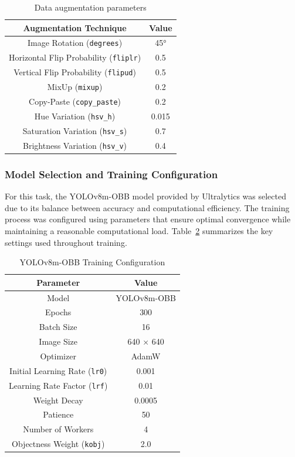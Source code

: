 \begin{table}[H]
\centering
\caption{Data augmentation parameters}
\label{tab:augmentations}
\begin{tabular}{|c|c|}
\hline
\textbf{Augmentation Technique} & \textbf{Value} \\
\hline
Image Rotation (\texttt{degrees}) & 45° \\
Horizontal Flip Probability (\texttt{fliplr}) & 0.5 \\
Vertical Flip Probability (\texttt{flipud}) & 0.5 \\
MixUp (\texttt{mixup}) & 0.2 \\
Copy-Paste (\texttt{copy\_paste}) & 0.2 \\
Hue Variation (\texttt{hsv\_h}) & 0.015 \\
Saturation Variation (\texttt{hsv\_s}) & 0.7 \\
Brightness Variation (\texttt{hsv\_v}) & 0.4 \\
\hline
\end{tabular}
\end{table}

\subsubsection{Model Selection and Training Configuration}

For this task, the YOLOv8m-OBB model provided by Ultralytics was selected due to its balance between accuracy and computational efficiency. The training process was configured using parameters that ensure optimal convergence while maintaining a reasonable computational load. Table~\ref{tab:train-config} summarizes the key settings used throughout training.

\begin{table}[H]
\centering
\caption{YOLOv8m-OBB Training Configuration}
\label{tab:train-config}
\begin{tabular}{|c|c|}
\hline
\textbf{Parameter} & \textbf{Value} \\
\hline
Model & YOLOv8m-OBB \\
Epochs & 300 \\
Batch Size & 16 \\
Image Size & 640 × 640 \\
Optimizer & AdamW \\
Initial Learning Rate (\texttt{lr0}) & 0.001 \\
Learning Rate Factor (\texttt{lrf}) & 0.01 \\
Weight Decay & 0.0005 \\
Patience & 50 \\
Number of Workers & 4 \\
Objectness Weight (\texttt{kobj}) & 2.0 \\
\hline
\end{tabular}
\end{table}



